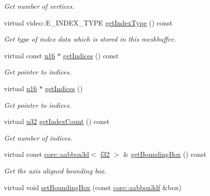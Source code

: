 \begin{DoxyCompactItemize}
\begin{DoxyCompactList}\small\item\em Get number of vertices. \end{DoxyCompactList}\item 
virtual video\+::\+E\+\_\+\+I\+N\+D\+E\+X\+\_\+\+T\+Y\+PE \hyperlink{classirr_1_1scene_1_1CMeshBuffer_aa183491690fa47b4697bbfcc7902301c}{get\+Index\+Type} () const
\begin{DoxyCompactList}\small\item\em Get type of index data which is stored in this meshbuffer. \end{DoxyCompactList}\item 
virtual const \hyperlink{namespaceirr_ae9f8ec82692ad3b83c21f555bfa70bcc}{u16} $\ast$ \hyperlink{classirr_1_1scene_1_1CMeshBuffer_a23af7e8ffb2ba674d1dd4448cea288bf}{get\+Indices} () const
\begin{DoxyCompactList}\small\item\em Get pointer to indices. \end{DoxyCompactList}\item 
virtual \hyperlink{namespaceirr_ae9f8ec82692ad3b83c21f555bfa70bcc}{u16} $\ast$ \hyperlink{classirr_1_1scene_1_1CMeshBuffer_a34a85f4868776d4cf312cdece5326c89}{get\+Indices} ()
\begin{DoxyCompactList}\small\item\em Get pointer to indices. \end{DoxyCompactList}\item 
virtual \hyperlink{namespaceirr_a0416a53257075833e7002efd0a18e804}{u32} \hyperlink{classirr_1_1scene_1_1CMeshBuffer_ac5585f4983423a4ba1f4ab4aba112c95}{get\+Index\+Count} () const
\begin{DoxyCompactList}\small\item\em Get number of indices. \end{DoxyCompactList}\item 
virtual const \hyperlink{classirr_1_1core_1_1aabbox3d}{core\+::aabbox3d}$<$ \hyperlink{namespaceirr_a0277be98d67dc26ff93b1a6a1d086b07}{f32} $>$ \& \hyperlink{classirr_1_1scene_1_1CMeshBuffer_a759863b44c024f79747019f492a5c7cf}{get\+Bounding\+Box} () const
\begin{DoxyCompactList}\small\item\em Get the axis aligned bounding box. \end{DoxyCompactList}\item 
virtual void \hyperlink{classirr_1_1scene_1_1CMeshBuffer_ab5a21d48a5af73f1ef880a48c3798a67}{set\+Bounding\+Box} (const \hyperlink{namespaceirr_1_1core_adfc8fa01b30044c55f3332a1d6c1aa19}{core\+::aabbox3df} \&box)

\end{DoxyCompactItemize}
